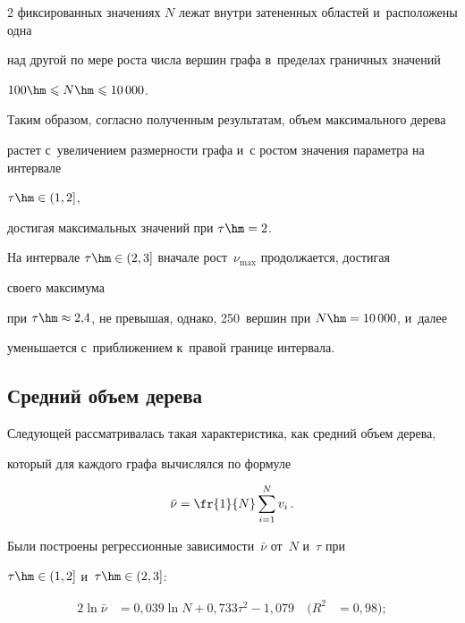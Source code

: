 \begin{multicols}{2}
фиксированных значениях $N$ лежат внутри затененных областей и~расположены одна 


над другой по мере роста числа вершин графа в~пределах граничных значений 


$100\hm\leqslant N\hm\leqslant 10\,000$.





Таким образом, согласно полученным результатам, объем максимального дерева 


растет с~увеличением размерности графа и~с ростом значения параметра на интервале 


$\tau\hm\in(1,2]$,


достигая максимальных значений при $\tau\hm=2$.


На интервале $\tau\hm\in(2,3]$ вначале рост~$\nu_{\max}$ продолжается, достигая 


своего максимума


при $\tau\hm\approx 2{,}4$, не превышая, однако, 250~вершин при $N\hm=10\,000$, и~далее 


уменьшается с~приближением к~правой границе интервала.





\vspace*{-4pt}





\subsection{Средний объем дерева}





Следующей рассматривалась такая характеристика, как средний объем дерева, 


который для каж\-до\-го графа вычислялся по формуле


\begin{equation*}


\bar{\nu}=\fr{1}{N}\sum\limits_{i=1}^N v_i\,.


\end{equation*}


Были построены регрессионные зависимости~$\bar{\nu}$ от~$N$ и~$\tau$ при 


$\tau\hm\in(1,2]$ и~$\tau\hm\in(2,3]$:


\begin{alignat*}{2}


\ln\bar{\nu} &= 0{,}039\ln N + 0{,}733 \tau^2 - 1{,}079 &\ (R^2&=0{,}98);



\end{alignat*}
\end{multicols}
